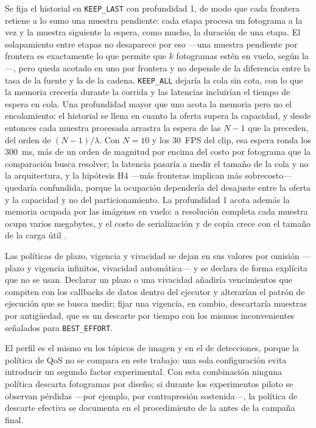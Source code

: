 Se fija el historial en \texttt{KEEP\_LAST} con profundidad 1, de modo que
cada frontera retiene a lo sumo una muestra pendiente: cada etapa procesa un
fotograma a la vez y la muestra siguiente la espera, como mucho, la duración
de una etapa. El solapamiento entre etapas no desaparece por eso ---una
muestra pendiente por frontera es exactamente lo que permite que $k$
fotogramas estén en vuelo, según la ---, pero queda
acotado en uno por frontera y no depende de la diferencia entre la tasa de la
fuente y la de la cadena. \texttt{KEEP\_ALL} dejaría la cola sin cota, con lo
que la memoria crecería durante la corrida y las latencias incluirían el
tiempo de espera en cola. Una profundidad mayor que uno acota la memoria pero
no el encolamiento: el historial se llena en cuanto la oferta supera la
capacidad, y desde entonces cada muestra procesada arrastra la espera de las
$N-1$ que la preceden, del orden de $(N-1)/\lambda$. Con $N=10$ y los 30~FPS
del clip, esa espera ronda los 300~ms, más de un orden de magnitud por encima
del costo por fotograma que la comparación busca resolver; la latencia pasaría
a medir el tamaño de la cola y no la arquitectura, y la hipótesis H4 —más
fronteras implican más sobrecosto— quedaría confundida, porque la ocupación
dependería del desajuste entre la oferta y la capacidad y no del
particionamiento. La profundidad 1 acota además la memoria ocupada por las
imágenes en vuelo: a resolución completa cada muestra ocupa varios megabytes,
y el costo de serialización y de copia crece con el tamaño de la carga útil
\cite{kronauer2021, luo2025}.

Las políticas de plazo, vigencia y vivacidad se dejan en sus valores por
omisión —plazo y vigencia infinitos, vivacidad automática— y se declara de
forma explícita que no se usan. Declarar un plazo o una vivacidad añadiría
vencimientos que compiten con los callbacks de datos dentro del ejecutor y
alterarían el patrón de ejecución que se busca medir; fijar una vigencia, en
cambio, descartaría muestras por antigüedad, que es un descarte por tiempo
con los mismos inconvenientes señalados para \texttt{BEST\_EFFORT}.

El perfil es el mismo en los tópicos de imagen y en el de detecciones, porque
la política de QoS no se compara en este trabajo: una sola configuración evita
introducir un segundo factor experimental. Con esta combinación ninguna
política descarta fotogramas por diseño; si durante los experimentos piloto se
observan pérdidas —por ejemplo, por contrapresión sostenida—, la política de
descarte efectiva se documenta en el procedimiento de la
 antes de la campaña final.

